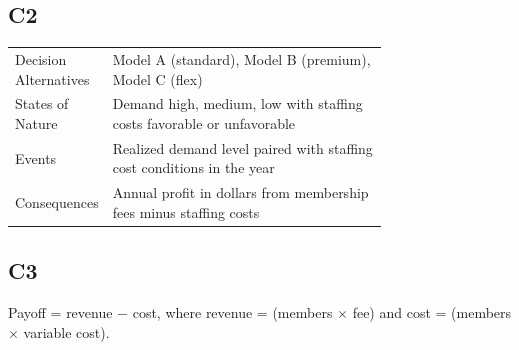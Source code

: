 \begin{ExamProblems}
		\subsection*{C2}
		\begin{center}
			\begin{tabular}{l p{0.74\linewidth}}
				\toprule
				Decision Alternatives & Model A (standard), Model B (premium), Model C (flex) \\
				States of Nature & Demand high, medium, low with staffing costs favorable or unfavorable \\
				Events & Realized demand level paired with staffing cost conditions in the year \\
				Consequences & Annual profit in dollars from membership fees minus staffing costs \\
				\bottomrule
			\end{tabular}
		\end{center}

		\subsection*{C3}
		Payoff = revenue $-$ cost, where revenue = (members $\times$ fee) and cost = (members $\times$ variable cost).


\end{ExamProblems}
